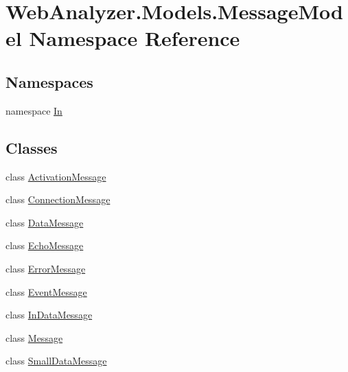 \hypertarget{namespace_web_analyzer_1_1_models_1_1_message_model}{}\section{Web\+Analyzer.\+Models.\+Message\+Model Namespace Reference}
\label{namespace_web_analyzer_1_1_models_1_1_message_model}
\subsection*{Namespaces}
\begin{DoxyCompactItemize}
\item 
namespace \hyperlink{namespace_web_analyzer_1_1_models_1_1_message_model_1_1_in}{In}
\end{DoxyCompactItemize}
\subsection*{Classes}
\begin{DoxyCompactItemize}
\item 
class \hyperlink{class_web_analyzer_1_1_models_1_1_message_model_1_1_activation_message}{Activation\+Message}
\item 
class \hyperlink{class_web_analyzer_1_1_models_1_1_message_model_1_1_connection_message}{Connection\+Message}
\item 
class \hyperlink{class_web_analyzer_1_1_models_1_1_message_model_1_1_data_message}{Data\+Message}
\item 
class \hyperlink{class_web_analyzer_1_1_models_1_1_message_model_1_1_echo_message}{Echo\+Message}
\item 
class \hyperlink{class_web_analyzer_1_1_models_1_1_message_model_1_1_error_message}{Error\+Message}
\item 
class \hyperlink{class_web_analyzer_1_1_models_1_1_message_model_1_1_event_message}{Event\+Message}
\item 
class \hyperlink{class_web_analyzer_1_1_models_1_1_message_model_1_1_in_data_message}{In\+Data\+Message}
\item 
class \hyperlink{class_web_analyzer_1_1_models_1_1_message_model_1_1_message}{Message}
\item 
class \hyperlink{class_web_analyzer_1_1_models_1_1_message_model_1_1_small_data_message}{Small\+Data\+Message}
\end{DoxyCompactItemize}
